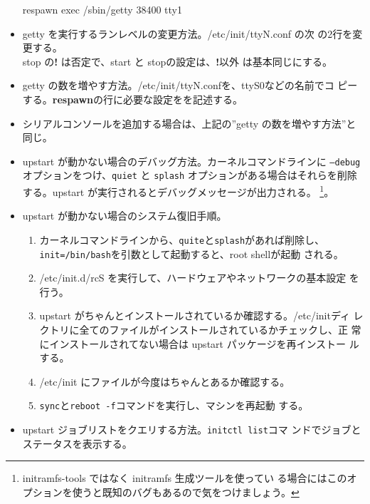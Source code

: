 \documentclass[mingoth,a4paper]{jsarticle}
\begin{document}
\begin{itemize}
\begin{commandline}
respawn
exec /sbin/getty 38400 tty1
\end{commandline}
 \item getty を実行するランレベルの変更方法。/etc/init/ttyN.conf の次
       の2行を変更する。\\
       stop の\textbf{!} は否定で、start と stopの設定は、\textbf{!}以外
       は基本同じにする。
 \item getty の数を増やす方法。/etc/init/ttyN.confを、ttyS0などの名前でコ
       ピーする。\textbf{respawn}の行に必要な設定をを記述する。
 \item シリアルコンソールを追加する場合は、上記の''getty の数を増やす方法''と同じ。
 \item upstart が動かない場合のデバッグ方法。カーネルコマンドラインに
       \texttt{--debug}オプションをつけ、\texttt{quiet} と
       \texttt{splash} オプションがある場合はそれらを削除する。upstart
       が実行されるとデバッグメッセージが出力される。
       \footnote{initramfs-tools ではなく initramfs 生成ツールを使ってい
       る場合にはこのオプションを使うと既知のバグもあるので気をつけましょう。}。
 \item upstart が動かない場合のシステム復旧手順。
 \begin{enumerate}
  \item カーネルコマンドラインから、\texttt{quite}と\texttt{splash}があれば削除し、
	\texttt{init=/bin/bash}を引数として起動すると、root shellが起動
	される。
  \item /etc/init.d/rcS を実行して、ハードウェアやネットワークの基本設定
	を行う。
  \item upstart がちゃんとインストールされているか確認する。/etc/initディ
	レクトリに全てのファイルがインストールされているかチェックし、正
	常にインストールされてない場合は upstart パッケージを再インストー
	ルする。
  \item /etc/init にファイルが今度はちゃんとあるか確認する。
  \item \texttt{sync}と\texttt{reboot -f}コマンドを実行し、マシンを再起動
	する。
 \end{enumerate}
 \item upstart ジョブリストをクエリする方法。\texttt{initctl list}コマ
       ンドでジョブとステータスを表示する。
\end{itemize}
\end{document}
